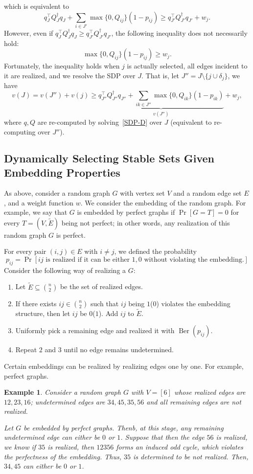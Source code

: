 \documentclass[10pt,leqno]{amsart}
\newtheorem{example}[theorem]{Example}
\begin{document}
which is equivalent to
\[q_J^\top Q_J^\dagger q_J+\sum_{i\in J'}\max\{0,Q_{ij}\}(1-p_{ij})\geq q_{J'}^\top Q_{J'}^\dagger q_{J'}+w_j.\]
However, even if $q_J^\top Q_J^\dagger q_J\geq q_{J'}^\top Q_{J'}^\dagger q_{J'}$, the following inequality does not necessarily hold:
\[\max\{0,Q_{ij}\}(1-p_{ij})\geq w_j.\]
Fortunately, the inequality holds when $j$ is actually selected, all edges incident to it are realized, and we resolve the SDP over $J$.
That is, let $J''=J\setminus\{j\cup\delta_j\}$, we have
\[v(J)= v(J'')+v(j)\geq \underbrace{q_{J''}^\top Q_{J''}^\dagger q_{J''}+\sum_{ik\in J''}\max\{0,Q_{ik}\}(1-p_{ik})}_{v(J'')}+w_j,\]
where $q,Q$ are re-computed by solving~\eqref{SDP-D} over $J$ (equivalent to re-computing over $J''$).
\subsection{Dynamically Selecting Stable Sets Given Embedding Properties}
As above, consider a random graph $G$ with vertex set $V$ and a random edge set $E$, and a weight function $w$.
We consider the embedding of the random graph. 
For example, we say that $G$ is embedded by perfect graphs if 
$\Pr[G=T] = 0$ for every $T=(V,\tilde{E})$ being not perfect; in other words, any realization of this random graph $G$ is perfect.

For every pair $(i,j)\in E$ with $i\neq j$, we defined the probability 
\[p_{ij}=\Pr[ij\text{ is realized if it can be either $1,0$ without violating the embedding.}]\]
Consider the following way of realizing a $G$:
\begin{enumerate}
    \item Let $\tilde{E}\subseteq \binom{n}{2}$ be the set of realized edges.
    \item If there exists $ij\in\binom{n}{2}$ such that $ij$ being $1$($0$) violates the embedding structure, then let $ij$ be $0$($1$).
    Add $ij$ to $\tilde{E}$.
    \item Uniformly pick a remaining edge and realized it with $\operatorname{Ber}(p_{ij})$.
    \item Repeat $2$ and $3$ until no edge remains undetermined.
\end{enumerate}
Certain embeddings can be realized by realizing edges one by one.
For example, perfect graphs.
\begin{example}
    Consider a random graph $G$ with $V=[6]$ whose realized edges are $12,23,16$;
    undetermined edges are $34,45,35,56$ and all remaining edges are not realized.
    
    Let $G$ be embedded by perfect graphs. Thenb, at this stage, any remaining undetermined edge can either be $0$ or $1$.
    Suppose that then the edge $56$ is realized, we know if $35$ is realized, then $12356$ forms an induced odd cycle, which violates the perfectness of the embedding.
    Thus, $35$ is determined to be not realized.
    Then, $34,45$ can either be $0$ or $1$.
\end{example}
\end{document}
